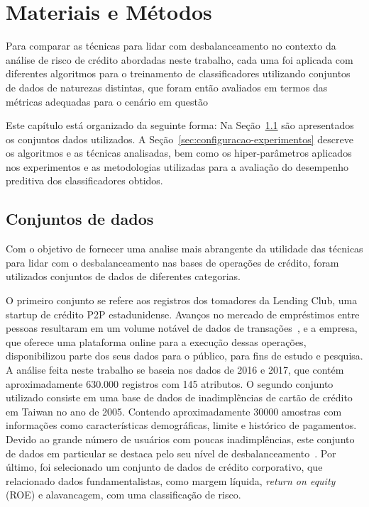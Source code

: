 \chapter{Materiais e Métodos}\label{cap:ferramentas}

Para comparar as técnicas para lidar com desbalanceamento no contexto da análise de risco de crédito abordadas neste trabalho, cada uma foi aplicada com diferentes algoritmos para o treinamento de classificadores utilizando conjuntos de dados de naturezas distintas, que foram então avaliados em termos das métricas adequadas para o cenário em questão

Este capítulo está organizado da seguinte forma: Na Seção~\ref{sec:datasets} são apresentados os conjuntos dados utilizados. A Seção~\ref{sec:configuracao-experimentos} descreve os algoritmos e as técnicas analisadas, bem como os hiper-parâmetros aplicados nos experimentos e as metodologias utilizadas para a avaliação do desempenho preditiva dos classificadores obtidos.

\section{Conjuntos de dados}\label{sec:datasets}

Com o objetivo de fornecer uma analise mais abrangente da utilidade das técnicas para lidar com o desbalanceamento nas bases de operações de crédito, foram utilizados conjuntos de dados de diferentes categorias.

O primeiro conjunto se refere aos registros dos tomadores da Lending Club, uma startup de crédito P2P estadunidense. Avanços no mercado de empréstimos entre pessoas resultaram em um volume notável de dados de transações~\cite{Namvar2018}, e a empresa, que oferece uma plataforma online para a execução dessas operações, disponibilizou parte dos seus dados para o público, para fins de estudo e pesquisa. A análise feita neste trabalho se baseia nos dados de 2016 e 2017, que contém aproximadamente \(630.000\) registros com 145 atributos. O segundo conjunto utilizado consiste em uma base de dados de inadimplências de cartão de crédito em Taiwan no ano de 2005. Contendo aproximadamente 30000 amostras com informações como características demográficas, limite e histórico de pagamentos. Devido ao grande número de usuários com poucas inadimplências, este conjunto de dados em particular se destaca pelo seu nível de desbalanceamento~\cite{Wei2025}. Por último, foi selecionado um conjunto de dados de crédito corporativo, que relacionado dados fundamentalistas, como margem líquida, \textit{return on equity} (ROE) e alavancagem, com uma classificação de risco.


